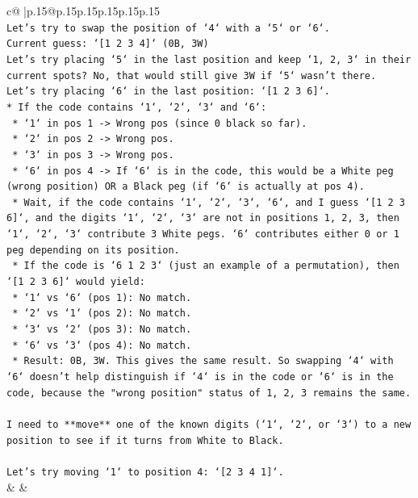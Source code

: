 \documentclass{article}
\begin{document}
{\begin{supertabular}{c@{$\;$}|p{.15\linewidth}@{}p{.15\linewidth}p{.15\linewidth}p{.15\linewidth}p{.15\linewidth}p{.15\linewidth}}
{{{\\ 
\texttt{Let's try to swap the position of `4` with a `5` or `6`.} \\
\texttt{Current guess: `{[}1 2 3 4{]}` (0B, 3W)} \\
\texttt{Let's try placing `5` in the last position and keep `1, 2, 3` in their current spots? No, that would still give 3W if `5` wasn't there.} \\
\texttt{Let's try placing `6` in the last position: `{[}1 2 3 6{]}`.} \\
\texttt{*   If the code contains `1`, `2`, `3` and `6`:} \\
\texttt{    *   `1` in pos 1 {-}> Wrong pos (since 0 black so far).} \\
\texttt{    *   `2` in pos 2 {-}> Wrong pos.} \\
\texttt{    *   `3` in pos 3 {-}> Wrong pos.} \\
\texttt{    *   `6` in pos 4 {-}> If `6` is in the code, this would be a White peg (wrong position) OR a Black peg (if `6` is actually at pos 4).} \\
\texttt{    *   Wait, if the code contains `1`, `2`, `3`, `6`, and I guess `{[}1 2 3 6{]}`, and the digits `1`, `2`, `3` are not in positions 1, 2, 3, then `1`, `2`, `3` contribute 3 White pegs. `6` contributes either 0 or 1 peg depending on its position.} \\
\texttt{    *   If the code is `6 1 2 3` (just an example of a permutation), then `{[}1 2 3 6{]}` would yield:} \\
\texttt{        *   `1` vs `6` (pos 1): No match.} \\
\texttt{        *   `2` vs `1` (pos 2): No match.} \\
\texttt{        *   `3` vs `2` (pos 3): No match.} \\
\texttt{        *   `6` vs `3` (pos 4): No match.} \\
\texttt{        *   Result: 0B, 3W. This gives the same result. So swapping `4` with `6` doesn't help distinguish if `4` is in the code or `6` is in the code, because the "wrong position" status of 1, 2, 3 remains the same.} \\
\\ 
\texttt{I need to **move** one of the known digits (`1`, `2`, or `3`) to a new position to see if it turns from White to Black.} \\
\\ 
\texttt{Let's try moving `1` to position 4: `{[}2 3 4 1{]}`.} \\
            }
        }
    }
    & & \\ \\


\end{supertabular}}
\end{document}
